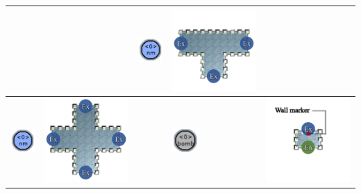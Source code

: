 \begin{longtable}{
    | >{\centering\arraybackslash} m{1.0cm}
    | >{\centering\arraybackslash} m{3.5cm}
    | >{} m{1.0cm}
    | >{\centering\arraybackslash} m{1.0cm}
    | >{\centering\arraybackslash} m{3.5cm} | }
    &
    & \begin{minipage}{.3\textwidth}\includegraphics[width=10mm]{figures/mission-grammars-alphabet/t-normal.png}\end{minipage}
    & \begin{minipage}{.3\textwidth}\includegraphics[width=35mm]{figures/mission-grammars-ins-rep/instruction-06.png}\end{minipage}
    \\\cline{1-2}\cline{4-5}
  \begin{minipage}{.3\textwidth}\includegraphics[width=10mm]{figures/mission-grammars-alphabet/t-normal.png}\end{minipage}
    & \begin{minipage}{.3\textwidth}\includegraphics[width=35mm]{figures/mission-grammars-ins-rep/instruction-07.png}\end{minipage}
    &
    & \begin{minipage}{.3\textwidth}\includegraphics[width=10mm]{figures/mission-grammars-alphabet/t-bomb.png}\end{minipage}
    & \begin{minipage}{.3\textwidth}\includegraphics[width=35mm]{figures/mission-grammars-ins-rep/instruction-08.png}\end{minipage}

\end{longtable}
